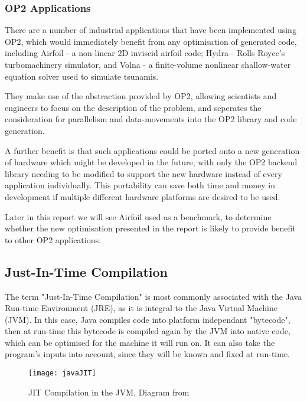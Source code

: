 \subsubsection{OP2 Applications}
There are a number of industrial applications that have been implemented using OP2, which would immediately benefit from any optimisation of generated code, including Airfoil \cite{airfoil} - a non-linear 2D inviscid airfoil code; Hydra \cite{hydra} - Rolls Royce’s turbomachinery simulator, and Volna \cite{volna} - a finite-volume nonlinear shallow-water equation solver used to simulate tsunamis.
\par
They make use of the abstraction provided by OP2, allowing scientists and engineers to focus on the description of the problem, and seperates the consideration for parallelism and data-movements into the OP2 library and code generation.
\par
A further benefit is that such applications could be ported onto a new generation of hardware which might be developed in the future, with only the OP2 backend library needing to be modified to support the new hardware instead of every application individually. This portability can save both time and money in development if multiple different hardware platforms are desired to be used.
\par
Later in this report we will see Airfoil used as a benchmark, to determine whether the new optimisation presented in the report is likely to provide benefit to other OP2 applications.

\subsection{Just-In-Time Compilation}
\label{ss:rw_JIT}

\hspace{\parindent}
The term "Just-In-Time Compilation" is most commonly associated with the Java Run-time Environment (JRE), as it is integral to the Java Virtual Machine (JVM). In this case, Java compiles code into platform independant "bytecode", then at run-time this bytecode is compiled again by the JVM into native code, which can be optimised for the machine it will run on. It can also take the program's inputs into account, since they will be known and fixed at run-time.
\begin{figure}[h!]
  \centering
  \texttt{[image: javaJIT]}
  \caption{\label{fig:javaJIT} JIT Compilation in the JVM. Diagram from \cite{javaJITsrc}}
\end{figure}

